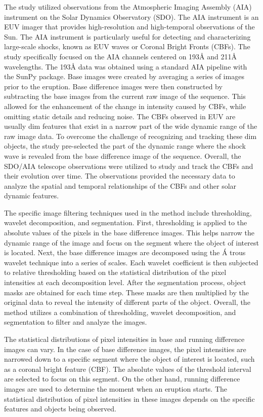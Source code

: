 The study utilized observations from the Atmospheric Imaging Assembly (AIA) instrument on the Solar Dynamics Observatory (SDO). The AIA instrument is an EUV imager that provides high-resolution and high-temporal observations of the Sun. The AIA instrument is particularly useful for detecting and characterizing large-scale shocks, known as EUV waves or Coronal Bright Fronts (CBFs).
The study specifically focused on the AIA channels centered on 193Å and 211Å wavelengths. The 193Å data was obtained using a standard AIA pipeline with the SunPy package. Base images were created by averaging a series of images prior to the eruption. Base difference images were then constructed by subtracting the base images from the current raw image of the sequence. This allowed for the enhancement of the change in intensity caused by CBFs, while omitting static details and reducing noise.
The CBFs observed in EUV are usually dim features that exist in a narrow part of the wide dynamic range of the raw image data. To overcome the challenge of recognizing and tracking these dim objects, the study pre-selected the part of the dynamic range where the shock wave is revealed from the base difference image of the sequence.
Overall, the SDO/AIA telescope observations were utilized to study and track the CBFs and their evolution over time. The observations provided the necessary data to analyze the spatial and temporal relationships of the CBFs and other solar dynamic features.

The specific image filtering techniques used in the method include thresholding, wavelet decomposition, and segmentation.
First, thresholding is applied to the absolute values of the pixels in the base difference images. This helps narrow the dynamic range of the image and focus on the segment where the object of interest is located.
Next, the base difference images are decomposed using the \'A trous wavelet technique into a series of scales. Each wavelet coefficient is then subjected to relative thresholding based on the statistical distribution of the pixel intensities at each decomposition level.
After the segmentation process, object masks are obtained for each time step. These masks are then multiplied by the original data to reveal the intensity of different parts of the object.
Overall, the method utilizes a combination of thresholding, wavelet decomposition, and segmentation to filter and analyze the images.

The statistical distributions of pixel intensities in base and running difference images can vary. In the case of base difference images, the pixel intensities are narrowed down to a specific segment where the object of interest is located, such as a coronal bright feature (CBF). The absolute values of the threshold interval are selected to focus on this segment. On the other hand, running difference images are used to determine the moment when an eruption starts. The statistical distribution of pixel intensities in these images depends on the specific features and objects being observed.

